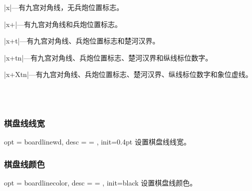 \documentclass[full]{l3doc}
\begin{document}
\begin{documentation}
  \begin{Description}[a]
    \item |x|---有九宫对角线，无兵炮位置标志。
    \item |x+|---有九宫对角线和兵炮位置标志。
    \item |x+t|---有九宫对角线、兵炮位置标志和楚河汉界。
    \item |x+tn|---有九宫对角线、兵炮位置标志、楚河汉界和纵线标位数字。
    \item |x+Xtn|---有九宫对角线、兵炮位置标志、楚河汉界、纵线标位数字和象位虚线。
  \end{Description}

\begin{SideBySideExample}[frame=single,numbers=left,
                xrightmargin=.54\linewidth,gobble=2]
  \centering
  \cchessboard*[boardtype=x]\quad
  \cchessboard*[boardtype=x+]\\
  \cchessboard*[boardtype=x+t]\quad
  \cchessboard*[boardtype=x+tn]\\
  \cchessboard*[boardtype=x+Xtn]
\end{SideBySideExample}

\bigskip

\subsubsection{棋盘线线宽}

\begin{option}{ opt = boardlinewd, desc = {= }, init=0.4pt }
  设置棋盘线线宽。
\end{option}

\begin{SideBySideExample}[frame=single,numbers=left,
                xrightmargin=.56\linewidth,gobble=2]
  \centering
  \cchessboard*[boardlinewd=1.0pt]
\end{SideBySideExample}

\bigskip

\subsubsection{棋盘线颜色}

\begin{option}{ opt = boardlinecolor, desc = {= }, init=black }
  设置棋盘线颜色。
\end{option}


\end{documentation}
\end{document}
